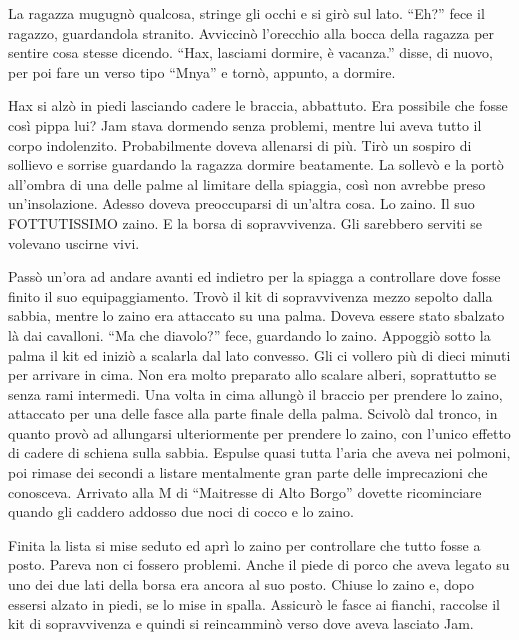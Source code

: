     La ragazza mugugnò qualcosa, stringe gli occhi e si girò sul lato.
    ``Eh?'' fece il ragazzo, guardandola stranito. Avviccinò l'orecchio
    alla bocca della ragazza per sentire cosa stesse dicendo. ``Hax,
    lasciami dormire, è vacanza.'' disse, di nuovo, per poi fare un verso
    tipo ``Mnya'' e tornò, appunto, a dormire.

    Hax si alzò in piedi lasciando cadere le braccia, abbattuto. Era
    possibile che fosse così pippa lui? Jam stava dormendo senza problemi,
    mentre lui aveva tutto il corpo indolenzito. Probabilmente doveva
    allenarsi di più. Tirò un sospiro di sollievo e sorrise guardando la
    ragazza dormire beatamente. La sollevò e la portò all'ombra di una
    delle palme al limitare della spiaggia, così non avrebbe preso
    un'insolazione. Adesso doveva preoccuparsi di un'altra cosa. Lo zaino.
    Il suo FOTTUTISSIMO zaino. E la borsa di sopravvivenza. Gli sarebbero
    serviti se volevano uscirne vivi.

    Passò un'ora ad andare avanti ed indietro per la spiagga a controllare
    dove fosse finito il suo equipaggiamento. Trovò il kit di sopravvivenza
    mezzo sepolto dalla sabbia, mentre lo zaino era attaccato su una palma.
    Doveva essere stato sbalzato là dai cavalloni. ``Ma che diavolo?''
    fece, guardando lo zaino. Appoggiò sotto la palma il kit ed iniziò a
    scalarla dal lato convesso. Gli ci vollero più di dieci minuti per
    arrivare in cima. Non era molto preparato allo scalare alberi,
    soprattutto se senza rami intermedi. Una volta in cima allungò il
    braccio per prendere lo zaino, attaccato per una delle fasce alla parte
    finale della palma. Scivolò dal tronco, in quanto provò ad allungarsi
    ulteriormente per prendere lo zaino, con l'unico effetto di cadere di
    schiena sulla sabbia. Espulse quasi tutta l'aria che aveva nei polmoni,
    poi rimase dei secondi a listare mentalmente gran parte delle
    imprecazioni che conosceva. Arrivato alla M di ``Maitresse di Alto
    Borgo'' dovette ricominciare quando gli caddero addosso due noci di
    cocco e lo zaino.

    Finita la lista si mise seduto ed aprì lo zaino per controllare che
    tutto fosse a posto. Pareva non ci fossero problemi. Anche il piede di
    porco che aveva legato su uno dei due lati della borsa era ancora al
    suo posto. Chiuse lo zaino e, dopo essersi alzato in piedi, se lo mise
    in spalla. Assicurò le fasce ai fianchi, raccolse il kit di
    sopravvivenza e quindi si reincamminò verso dove aveva lasciato Jam.

